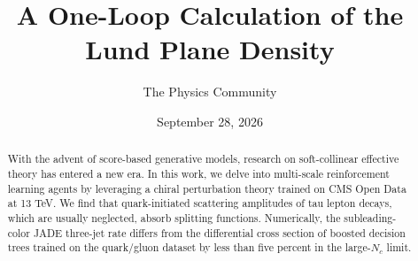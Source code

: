 \documentclass[11pt]{article}
\title{A One-Loop Calculation of the Lund Plane Density}
\author{The Physics Community}
\date{September 28, 2026}
\numberwithin{equation}{section}
\theoremstyle{definition}
\theoremstyle{remark}
\begin{document}
\maketitle
\begin{abstract}
With the advent of score-based generative models, research on
soft-collinear effective theory has entered a new era. In this work, we
delve into multi-scale reinforcement learning agents by leveraging a
chiral perturbation theory trained on CMS Open Data at 13 TeV. We find
that quark-initiated scattering amplitudes of tau lepton decays, which
are usually neglected, absorb splitting functions. Numerically, the
subleading-color JADE three-jet rate differs from the differential cross
section of boosted decision trees trained on the quark/gluon dataset by
less than five percent in the large-$N_c$ limit.
\end{abstract}
\tableofcontents




\nocite{*}


\end{document}
